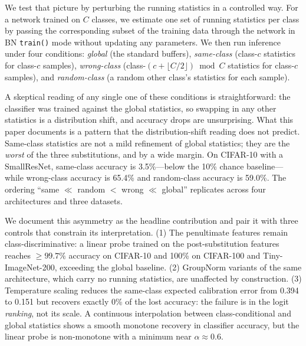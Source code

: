\documentclass{article}
\begin{document}
We test that picture by perturbing the running statistics in a controlled way. For a network trained on $C$ classes, we estimate one set of running statistics per class by passing the corresponding subset of the training data through the network in BN \texttt{train()} mode without updating any parameters. We then run inference under four conditions: \emph{global} (the standard buffers), \emph{same-class} (class-$c$ statistics for class-$c$ samples), \emph{wrong-class} (class-$(c+\lfloor C/2\rfloor) \bmod C$ statistics for class-$c$ samples), and \emph{random-class} (a random other class's statistics for each sample).

A skeptical reading of any single one of these conditions is straightforward: the classifier was trained against the global statistics, so swapping in any other statistics is a distribution shift, and accuracy drops are unsurprising. What this paper documents is a pattern that the distribution-shift reading does not predict. Same-class statistics are not a mild refinement of global statistics; they are the \emph{worst} of the three substitutions, and by a wide margin. On CIFAR-10 with a SmallResNet, same-class accuracy is 3.5\%---below the 10\% chance baseline---while wrong-class accuracy is 65.4\% and random-class accuracy is 59.0\%. The ordering ``same $\ll$ random $<$ wrong $\ll$ global'' replicates across four architectures and three datasets.

We document this asymmetry as the headline contribution and pair it with three controls that constrain its interpretation. (1) The penultimate features remain class-discriminative: a linear probe trained on the post-substitution features reaches $\geq 99.7\%$ accuracy on CIFAR-10 and 100\% on CIFAR-100 and Tiny-ImageNet-200, exceeding the global baseline. (2) GroupNorm \citep{wu2018group} variants of the same architecture, which carry no running statistics, are unaffected by construction. (3) Temperature scaling \citep{guo2017calibration} reduces the same-class expected calibration error from 0.394 to 0.151 but recovers exactly 0\% of the lost accuracy: the failure is in the logit \emph{ranking}, not its scale. A continuous interpolation between class-conditional and global statistics shows a smooth monotone recovery in classifier accuracy, but the linear probe is non-monotone with a minimum near $\alpha\approx 0.6$.
\end{document}
